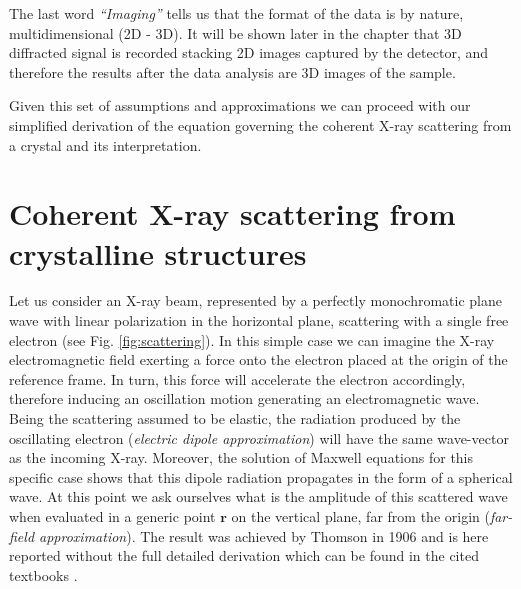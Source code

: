 \begin{itemize}

\end{itemize}

The last word \textit{``Imaging''} tells us that the format of the data is by nature, multidimensional (2D - 3D). It 
will be shown later in the chapter that 3D diffracted signal is recorded stacking 2D images captured by the detector, 
and therefore the results after the data analysis are 3D images of the sample.

Given this set of assumptions and approximations we can proceed with our simplified derivation of the equation governing 
the coherent X-ray scattering from a crystal and its interpretation. 

\section{Coherent X-ray scattering from crystalline structures}

Let us consider an X-ray beam, represented by a perfectly monochromatic plane wave with linear polarization in the horizontal 
plane, scattering with a single free electron (see Fig. \ref{fig:scattering}). In this simple case we can imagine the 
X-ray electromagnetic field exerting a force onto the electron placed at the origin of the reference frame. In turn, 
this force will accelerate the electron accordingly, therefore inducing an oscillation motion generating
an electromagnetic wave. Being the scattering assumed to be elastic, the radiation 
produced by the oscillating electron (\textit{electric dipole approximation}) will have the same wave-vector as the incoming X-ray. 
Moreover, the solution of Maxwell equations for this specific case 
shows that this dipole radiation propagates in the form of a spherical wave. At this point we ask ourselves what is the amplitude 
of this scattered wave when evaluated in a generic point $\mathbf r$ on the vertical plane, far from the origin (\textit{far-field approximation}). 
The result was achieved by Thomson in 1906 and is here reported without the full detailed derivation which can be found in the 
cited textbooks \cite{alsnielsen_mcmorrow2011,ashcroft_mermin1976, guinier1994}. 


